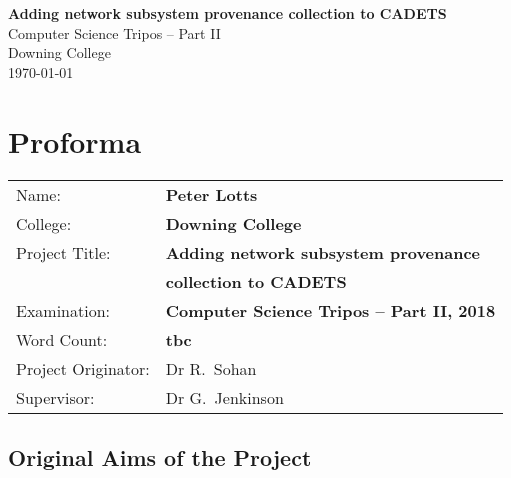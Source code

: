 \documentclass[a4paper,12pt,twoside,openright]{report}
\begin{document}
	
	
	
	
	
	
	\pagestyle{empty}
	
	
	\vspace*{60mm}
	\begin{center}
		\Huge
		\textbf{Adding network subsystem provenance collection to CADETS} \\[5mm]
		Computer Science Tripos -- Part II \\[5mm]
		Downing College \\[5mm]
		\today  %
	\end{center}
	
	
	\pagestyle{plain}
	
	\chapter*{Proforma}
	
	{\large
		\begin{tabular}{ll}
			Name:               & \bf Peter Lotts                       \\
			College:            & \bf Downing College                     \\
			Project Title:      & \bf Adding network subsystem provenance \\
								& \bf collection to CADETS \\
			Examination:        & \bf Computer Science Tripos -- Part II, 2018  \\
			Word Count:         & \bf tbc\footnotemark[1]  \\
			Project Originator: & Dr R.~Sohan                    \\
			Supervisor:         & Dr G.~Jenkinson                    \\ 
		\end{tabular}
	}
	
	
	\section*{Original Aims of the Project}
	
\end{document}
